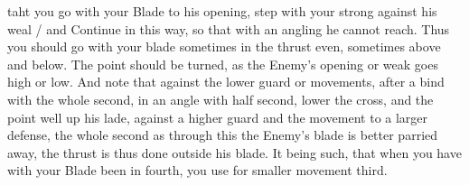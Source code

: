 \newpage


\newpage

taht you go with your Blade to his opening, step with your strong
against his weal / and Continue in this way, so that with an angling he
cannot reach. Thus you should go with your blade sometimes in the
thrust even, sometimes above and below. The point should be turned, as
the Enemy's opening or weak goes high or low.
And note that against the lower guard or movements, after a bind with
the whole second, in an angle with half second, lower the cross, and
the point well up his lade, against a higher guard and the movement to
a larger defense, the whole second as through this the Enemy's blade
is better parried away, the thrust is thus done outside his blade. It
being such, that when you have with your Blade been in fourth, you use
for smaller movement third. 

